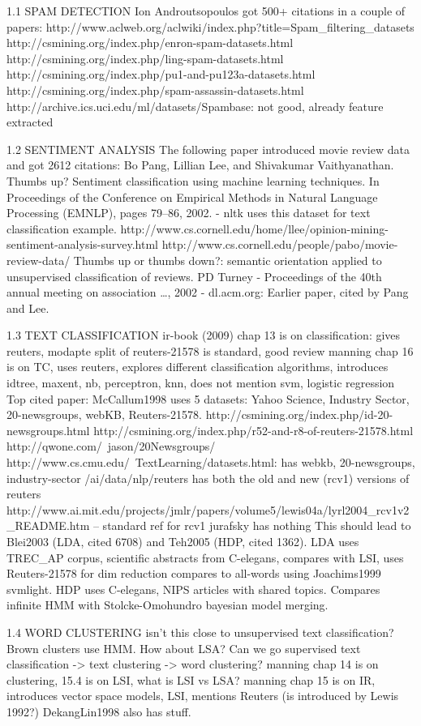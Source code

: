 1.1 SPAM DETECTION
Ion Androutsopoulos got 500+ citations in a couple of papers:
http://www.aclweb.org/aclwiki/index.php?title=Spam_filtering_datasets
http://csmining.org/index.php/enron-spam-datasets.html
http://csmining.org/index.php/ling-spam-datasets.html
http://csmining.org/index.php/pu1-and-pu123a-datasets.html
http://csmining.org/index.php/spam-assassin-datasets.html
http://archive.ics.uci.edu/ml/datasets/Spambase: not good, already feature extracted

1.2 SENTIMENT ANALYSIS
The following paper introduced movie review data and got 2612 citations:
Bo Pang, Lillian Lee, and Shivakumar Vaithyanathan. Thumbs up? Sentiment classiﬁcation using
machine learning techniques. In Proceedings of the Conference on Empirical Methods in Natural
Language Processing (EMNLP), pages 79–86, 2002.
- nltk uses this dataset for text classification example.
http://www.cs.cornell.edu/home/llee/opinion-mining-sentiment-analysis-survey.html
http://www.cs.cornell.edu/people/pabo/movie-review-data/
Thumbs up or thumbs down?: semantic orientation applied to unsupervised classification of reviews. PD Turney - Proceedings of the 40th annual meeting on association …, 2002 - dl.acm.org: Earlier paper, cited by Pang and Lee.


1.3 TEXT CLASSIFICATION
ir-book (2009) chap 13 is on classification: gives reuters, modapte split of reuters-21578 is standard, good review
manning chap 16 is on TC, uses reuters, explores different classification algorithms, introduces idtree, maxent, nb, perceptron, knn, does not mention svm, logistic regression
Top cited paper: McCallum1998 uses 5 datasets: Yahoo Science, Industry Sector, 20-newsgroups, webKB, Reuters-21578.
http://csmining.org/index.php/id-20-newsgroups.html
http://csmining.org/index.php/r52-and-r8-of-reuters-21578.html
http://qwone.com/~jason/20Newsgroups/
http://www.cs.cmu.edu/~TextLearning/datasets.html: has webkb, 20-newsgroups, industry-sector
/ai/data/nlp/reuters has both the old and new (rcv1) versions of reuters
http://www.ai.mit.edu/projects/jmlr/papers/volume5/lewis04a/lyrl2004_rcv1v2_README.htm -- standard ref for rcv1
jurafsky has nothing
This should lead to Blei2003 (LDA, cited 6708) and Teh2005 (HDP, cited 1362).  LDA uses TREC_AP corpus, scientific abstracts from C-elegans, compares with LSI, uses Reuters-21578 for dim reduction compares to all-words using Joachims1999 svmlight.  HDP uses C-elegans, NIPS articles with shared topics.  Compares infinite HMM with Stolcke-Omohundro bayesian model merging.

1.4 WORD CLUSTERING
isn't this close to unsupervised text classification?
Brown clusters use HMM.
How about LSA?  Can we go supervised text classification -> text clustering -> word clustering?
manning chap 14 is on clustering, 15.4 is on LSI, what is LSI vs LSA?
manning chap 15 is on IR, introduces vector space models, LSI, mentions Reuters (is introduced by Lewis 1992?)
DekangLin1998 also has stuff.


